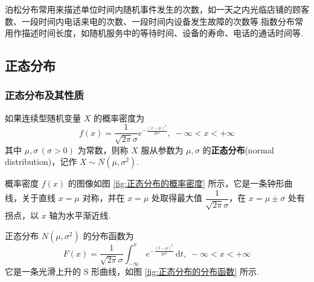 \begin{note}
    \indent 泊松分布常用来描述单位时间内随机事件发生的次数，如一天之内光临店铺的顾客数、一段时间内电话来电的次数、一段时间内设备发生故障的次数等.指数分布常用作描述时间长度，如随机服务中的等待时间、设备的寿命、电话的通话时间等.
\end{note}

\subsection{正态分布}

\subsubsection{正态分布及其性质}

\begin{definition}
    \indent 如果连续型随机变量 $X$ 的概率密度为
    $$
    f(x) = \dfrac{1}{\sqrt{2\pi} \sigma} e^{-\frac{(x-\mu)^2}{2\sigma^2}}, \; -\infty < x < +\infty
    $$
    其中 $\mu,\sigma \, (\sigma>0)$ 为常数，则称 $X$ 服从参数为 $\mu,\sigma$ 的\textbf{正态分布}(normal distribution)，记作 $X \sim N(\mu,\sigma^2)$.
\end{definition}

概率密度 $f(x)$ 的图像如图 \ref{fig:正态分布的概率密度} 所示，它是一条钟形曲线，关于直线 $x=\mu$ 对称，并在 $x=\mu$ 处取得最大值 $\dfrac{1}{\sqrt{2\pi}\sigma}$，在 $x=\mu\pm\sigma$ 处有拐点，以 $x$ 轴为水平渐近线.

\vspace{0.5em}

正态分布 $N(\mu,\sigma^2)$ 的分布函数为
$$
F(x) = \dfrac{1}{\sqrt{2\pi} \sigma} \int_{-\infty}^x e^{-\frac{(t-\mu)^2}{2\sigma^2}} \, \text{d}t, \; -\infty < x < +\infty
$$
它是一条光滑上升的 S 形曲线，如图 \ref{fig:正态分布的分布函数} 所示.

